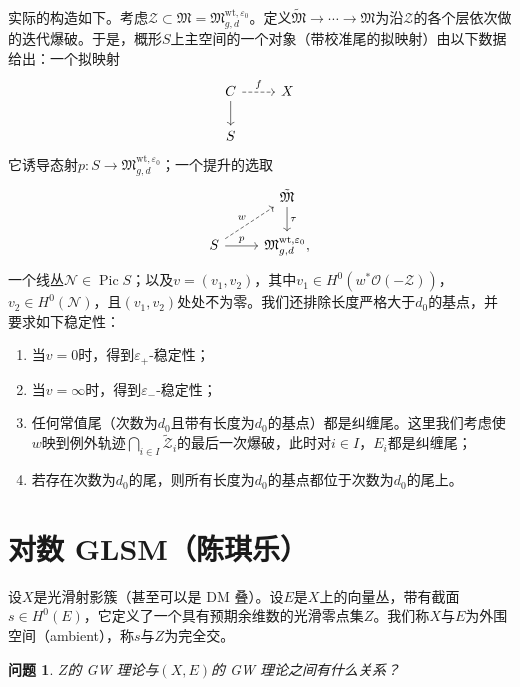 \documentclass{amsart}
\newtheorem{quest}[thm]{问题}
\theoremstyle{definition}
\theoremstyle{remark}
\theoremstyle{plain}
\theoremstyle{definition}
\theoremstyle{remark}
\newcommand{\ep}{\varepsilon}
\newcommand{\mc}[1]{\mathcal{#1}}
\newcommand{\mf}[1]{\mathfrak{#1}}
\newcommand{\mr}[1]{\mathrm{#1}}
\newcommand{\1}{\mathbf{1}}
\newcommand{\2}{\mathbf{2}}
\newcommand{\3}{\mathbf{3}}
\DeclareMathOperator{\Pic}{Pic}
\begin{document}
实际的构造如下。考虑\(\mc{Z} \subset \mf{M} = \mf{M}_{g,d}^{\mr{wt}, \ep_0}\)。定义\(\tilde{\mf{M}} \to \cdots \to \mf{M}\)为沿\(\mc{Z}\)的各个层依次做的迭代爆破。于是，概形\(S\)上主空间的一个对象（带校准尾的拟映射）由以下数据给出：一个拟映射
\begin{equation*}
\begin{tikzcd}
    C \ar{d} \ar[dashrightarrow]{r}{f} & X \\
    S
\end{tikzcd}
\end{equation*}
它诱导态射\(p \colon S \to \mf{M}_{g,d}^{\mr{wt}, \ep_0}\)；一个提升的选取
\begin{equation*}
\begin{tikzcd}
    & \tilde{\mf{M}} \ar{d}{\tau} \\
    S \ar{r}{p} \ar[dashrightarrow]{ur}{w} & \mf{M}_{g,d}^{\mr{wt}, \ep_0},
\end{tikzcd}
\end{equation*}
一个线丛\(\mc{N} \in \Pic S\)；以及\(v = (v_1, v_2)\)，其中\(v_1 \in H^0(w^* \mc{O}(-\mc{Z}))\)，\(v_2 \in H^0(\mc{N})\)，且\((v_1, v_2)\)处处不为零。我们还排除长度严格大于\(d_0\)的基点，并要求如下稳定性：
\begin{enumerate}
    \item 当\(v = 0\)时，得到\(\ep_+\)-稳定性；
    \item 当\(v = \infty\)时，得到\(\ep_-\)-稳定性；
    \item 任何常值尾（次数为\(d_0\)且带有长度为\(d_0\)的基点）都是纠缠尾。这里我们考虑使\(w\)映到例外轨迹\(\bigcap_{i \in I} \tilde{\mc{Z}}_i\)的最后一次爆破，此时对\(i \in I\)，\(E_i\)都是纠缠尾；
    \item 若存在次数为\(d_0\)的尾，则所有长度为\(d_0\)的基点都位于次数为\(d_0\)的尾上。
\end{enumerate}







\section{对数 GLSM（陈琪乐）}%
\label{sec:Log GLSM (Qile Chen)}

设\(X\)是光滑射影簇（甚至可以是 DM 叠）。设\(E\)是\(X\)上的向量丛，带有截面\(s \in H^0(E)\)，它定义了一个具有预期余维数的光滑零点集\(Z\)。我们称\(X\)与\(E\)为外围空间（ambient），称\(s\)与\(Z\)为完全交。

\begin{quest}
    \(Z\)的 GW 理论与\((X, E)\)的 GW 理论之间有什么关系？
\end{quest}
\end{document}

